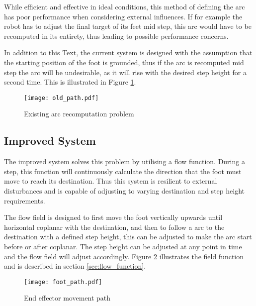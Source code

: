             While efficient and effective in ideal conditions, this method of defining the arc has poor performance when considering external
            influences. If for example the robot has to adjust the final target of its feet mid step, this arc would have to be recomputed in its entirety,
            thus leading to possible performance concerns.

            In addition to this Text, the current system is designed with the assumption that the starting position of the foot is grounded, thus if the arc is recomputed
            mid step the arc will be undesirable, as it will rise with the desired step height for a second time. This is illustrated in Figure \ref{fig:old_arc}.

            \begin{figure}[h]
                \centering
                \hspace{-1.38cm}
                \texttt{[image: old\_path.pdf]}
                \caption{Existing arc recomputation problem}
                \label{fig:old_arc}
            \end{figure}

        \newpage
        \subsection{Improved System}
            The improved system solves this problem by utilising a flow function. During a step, this function will continuously calculate the
            direction that the foot must move to reach its destination. Thus this system is resilient to external disturbances and is capable of adjusting to
            varying destination and step height requirements. 
            
            The flow field is designed to first move the foot vertically upwards until horizontal coplanar with the destination, and then to follow a
            arc to the destination with a defined step height, this can be adjusted to make the arc start before or after coplanar. The step height can be adjusted at any point in time and the flow field will adjust accordingly.
            Figure \ref{fig:foot_arc} illustrates the field function and is described in section \ref{sec:flow_function}.
            \begin{figure}[h]
                \centering
                \hspace{-1.38cm}
                \texttt{[image: foot\_path.pdf]}
                \caption{End effector movement path}
                \label{fig:foot_arc}
            \end{figure}


